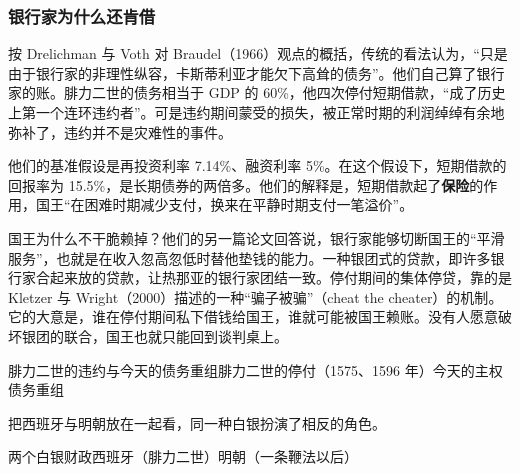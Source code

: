 \subsubsection{银行家为什么还肯借}
按 Drelichman 与 Voth 对 Braudel（1966）观点的概括，传统的看法认为，“只是由于银行家的非理性纵容，卡斯蒂利亚才能欠下高耸的债务”\cite{dv2010}。他们自己算了银行家的账。腓力二世的债务相当于 GDP 的 60\%，他四次停付短期借款，“成了历史上第一个连环违约者”。可是违约期间蒙受的损失，被正常时期的利润绰绰有余地弥补了，违约并不是灾难性的事件\cite{dv2011eeh}。

他们的基准假设是再投资利率 7.14\%、融资利率 5\%。在这个假设下，短期借款的回报率为 15.5\%，是长期债券的两倍多\cite{dv2011eeh}。他们的解释是，短期借款起了\textbf{保险}的作用，国王“在困难时期减少支付，换来在平静时期支付一笔溢价”\cite{dv2011eeh}。

国王为什么不干脆赖掉？他们的另一篇论文回答说，银行家能够切断国王的“平滑服务”，也就是在收入忽高忽低时替他垫钱的能力。一种银团式的贷款，即许多银行家合起来放的贷款，让热那亚的银行家团结一致。停付期间的集体停贷，靠的是 Kletzer 与 Wright（2000）描述的一种“骗子被骗”（cheat the cheater）的机制\cite{dv2011ej}。它的大意是，谁在停付期间私下借钱给国王，谁就可能被国王赖账。没有人愿意破坏银团的联合，国王也就只能回到谈判桌上。

\begin{compare}{腓力二世的违约与今天的债务重组}{腓力二世的停付（1575、1596 年）}{今天的主权债务重组}
\end{compare}

把西班牙与明朝放在一起看，同一种白银扮演了相反的角色。

\begin{compare}{两个白银财政}{西班牙（腓力二世）}{明朝（一条鞭法以后）}
\end{compare}

